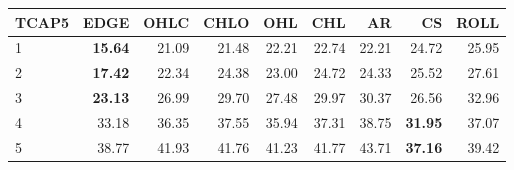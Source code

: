 \begin{table}[ht]
\centering
\begin{tabular}{lrrrrrrrr}
  \hline
TCAP5 & EDGE & OHLC & CHLO & OHL & CHL & AR & CS & ROLL \\ 
  \hline
1 & \textbf{15.64} & 21.09 & 21.48 & 22.21 & 22.74 & 22.21 & 24.72 & 25.95 \\ 
  2 & \textbf{17.42} & 22.34 & 24.38 & 23.00 & 24.72 & 24.33 & 25.52 & 27.61 \\ 
  3 & \textbf{23.13} & 26.99 & 29.70 & 27.48 & 29.97 & 30.37 & 26.56 & 32.96 \\ 
  4 & 33.18 & 36.35 & 37.55 & 35.94 & 37.31 & 38.75 & \textbf{31.95} & 37.07 \\ 
  5 & 38.77 & 41.93 & 41.76 & 41.23 & 41.77 & 43.71 & \textbf{37.16} & 39.42 \\ 
   \hline
\end{tabular}
\end{table}
